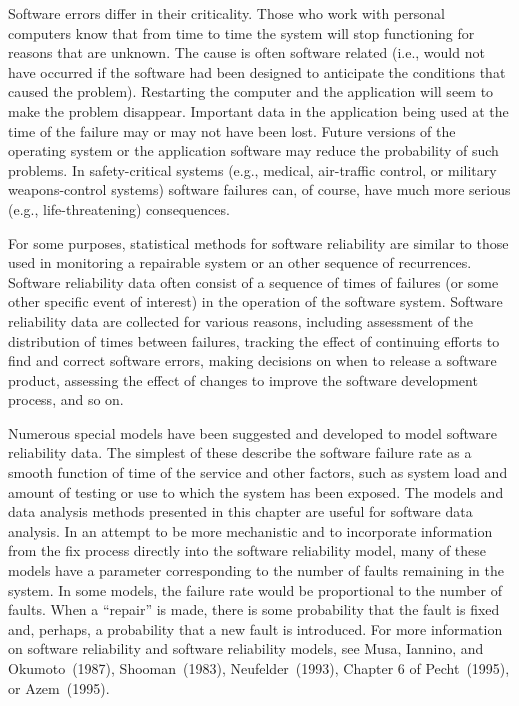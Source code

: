 Software errors differ in their criticality. Those who work with
personal computers know that from time to time the system will stop
functioning for reasons that are unknown.  The cause is often
software related (i.e., would not have occurred if the software had
been designed to anticipate the conditions that caused the
problem). Restarting the computer and the application will seem to
make the problem disappear. Important data in the application being
used at the time of the failure may or may not have been lost.
Future versions of the operating system or the application software
may reduce the probability of such problems.  In safety-critical
systems (e.g., medical, air-traffic control, or military
weapons-control systems) software failures can, of course, have much
more serious (e.g., life-threatening) consequences.

For some purposes, statistical methods for software reliability are
similar to those used in monitoring a repairable system or an other
sequence of recurrences.  Software reliability data often consist of
a sequence of times of failures (or some other specific event of
interest) in the operation of the software system. Software
reliability data are collected for various reasons, including
assessment of the distribution of times between failures, tracking
the effect of continuing efforts to find and correct software
errors, making decisions on when to release a software product,
assessing the effect of changes to improve the software development
process, and so on.

Numerous special models have been suggested and developed to model
software reliability data. The simplest of these describe the
software failure rate as a smooth function of time of the service
and other factors, such as system load and amount of testing or use
to which the system has been exposed.  The models and data analysis
methods presented in this chapter are useful for software data
analysis. In an attempt to be more mechanistic and to incorporate
information from the fix process directly into the software
reliability model, many of these models have a parameter
corresponding to the number of faults remaining in the system. In
some models, the failure rate would be proportional to the number of
faults. When a ``repair'' is made, there is some probability that
the fault is fixed and, perhaps, a probability that a new fault is
introduced.  For more information on software reliability and
software reliability models, see Musa, Iannino, and Okumoto~(1987),
Shooman~(1983), Neufelder~(1993), Chapter 6 of Pecht~(1995), or
Azem~(1995).

